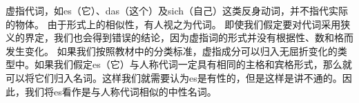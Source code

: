 虚指代词，如es（它）、das（这个）及sich（自己）这类反身动词，并不指代实际的物体。
由于形式上的相似性，有人视之为代词。
即使我们假定要对代词采用狭义的界定，我们也会得到错误的结论，因为虚指词的形式并没有根据性、数和格而发生变化。
如果我们按照教材中的分类标准，虚指成分可以归入无屈折变化的类型中。如果我们假定es（它）与人称代词一定具有相同的主格和宾格形式，那么就可以将它们归入名词。这样我们就需要认为es是有性的，但是这样是讲不通的。因此，我们将es看作是与人称代词相似的中性名词。

